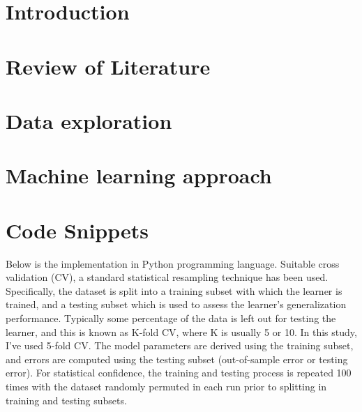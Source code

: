 \documentclass[a4paper,12pt,oneside]{book}
\begin{document}
\frontmatter
{}




\tableofcontents
\newpage
{}
\listoftables
\newpage
{}
\listoffigures
 
\mainmatter

\chapter{Introduction}
\fontsize{12pt}{18pt}\selectfont


\chapter{Review of Literature}
\fontsize{12pt}{18pt}\selectfont


\chapter{Data exploration}
\fontsize{12pt}{18pt}\selectfont


\chapter{Machine learning approach}
\fontsize{12pt}{18pt}\selectfont


\chapter{Code Snippets}
\fontsize{12pt}{18pt}\selectfont
Below is the implementation in Python programming language. Suitable cross validation (CV), a standard statistical resampling technique has been used. Specifically, the dataset is split into a training subset with which the learner is trained, and a testing subset which is used to assess the learner’s generalization performance. Typically some percentage of the data is left out for testing the learner, and this is known as K-fold CV, where K is usually 5 or 10. In this study, I've used 5-fold CV. The model parameters are derived using the training subset, and errors are computed using the testing subset (out-of-sample error or testing error).
For statistical confidence, the training and testing process is repeated 100 times with the dataset randomly permuted in each run prior to splitting in training and testing subsets.
\newline

\end{document}

